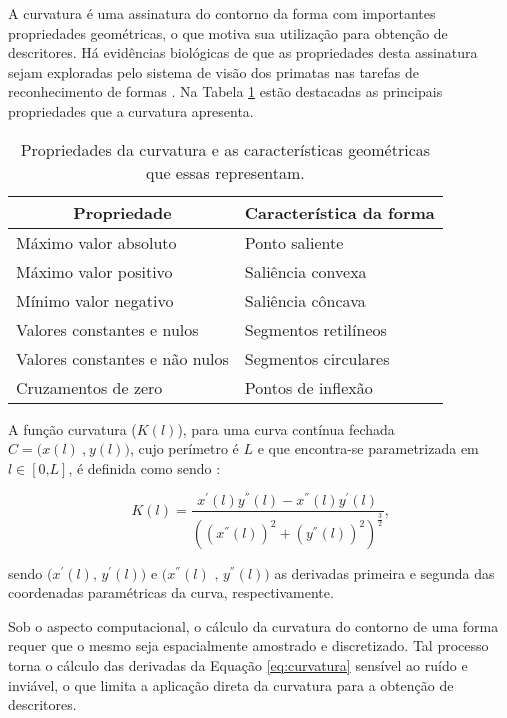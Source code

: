 A curvatura é uma assinatura do contorno da forma com importantes propriedades geométricas, o que motiva sua utilização para obtenção de descritores. Há evidências biológicas de que as propriedades desta assinatura sejam exploradas pelo sistema de visão dos primatas nas tarefas de reconhecimento de formas \cite{Costa:2009}. Na Tabela \ref{tbl:curv} estão destacadas as principais propriedades que a curvatura apresenta.  

\begin{table}
\centering
\caption{\label{tbl:curv} Propriedades da curvatura e as características geométricas que essas representam.}
\begin{tabular}[]{ll}
\toprule
\multicolumn{1}{c|}{Propriedade} & \multicolumn{1}{c}{Característica da forma}\\ 
\hline
Máximo valor absoluto & Ponto saliente \\
Máximo valor positivo & Saliência convexa \\
Mínimo valor negativo & Saliência côncava \\
Valores constantes e nulos & Segmentos retilíneos \\
Valores constantes e não nulos & Segmentos circulares \\
Cruzamentos de zero & Pontos de inflexão \\ \bottomrule
\end{tabular}
\end{table}

A função curvatura ($K(l)$), para uma curva contínua fechada $C = \big(x(l)\:\text{,}\:y(l)\big)$,  cujo perímetro é $L$ e que encontra-se parametrizada em $l \in [0\text{,}L]$, é definida como sendo \cite{Kindratenko:2003}:

\begin{equation} \label{eq:curvatura}
K(l) = \frac{x^{'}(l)y^{''}(l)-x^{''}(l)y^{'}(l)}{((x^{''}(l))^{2}+(y^{''}(l))^{2})^{\frac{3}{2}}}\text{,}
\end{equation}

\noindent 
sendo $\big(x^{'}(l) \text{, }y^{'}(l)\big)$ e $\big(x^{''}(l)\text{ , }y^{''}(l)\big)$ as derivadas primeira e segunda das coordenadas paramétricas da curva, respectivamente.

Sob o aspecto computacional, o cálculo da curvatura do contorno de uma forma requer que o mesmo seja espacialmente amostrado e discretizado. Tal processo torna o cálculo das derivadas da Equação \ref{eq:curvatura} sensível ao ruído e inviável, o que limita a aplicação direta da curvatura para a obtenção de descritores. 

